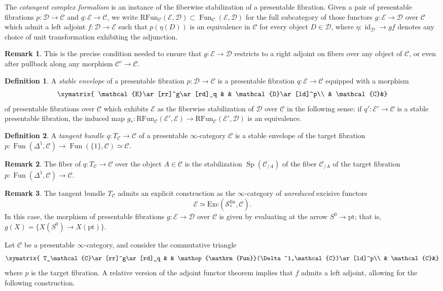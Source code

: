\documentclass[12pt]{article}
\theoremstyle{definition}
\newtheorem{definition}{Definition}[subsection]
\newtheorem{remark}{Remark}[subsection]
\newcommand{\C}{\mathcal{C}}
\newcommand{\D}{\mathcal{D}}
\newcommand{\E}{\mathcal{E}}
\renewcommand{\S}{\mathcal{S}}
\renewcommand{\i}{\infty}
\DeclareMathOperator{\Fun}{Fun}
\newcommand{\Funr}{\mathrm{RFun}}
\DeclareMathOperator{\id}{id}
\DeclareMathOperator{\Sp}{Sp}
\newcommand{\pt}{\mathrm{pt}}
\begin{document}
The {\em cotangent complex formalism} is an instance of the fiberwise stabilization of a presentable  fibration.
Given a pair of presentable fibrations $p:\D\to\C$ and $q:\E\to\C$, we write $\Funr_\C(\E,\D)\subset\Fun_\C(\E,\D)$ for the full subcategory of those functors $g:\E\to\D$ over $\C$ which admit a left adjoint $f:\D\to\E$ such that $p(\eta(D))$ is an equivalence in $\C$ for every object $D\in\D$, where $\eta:\id_\D\to gf$ denotes any choice of unit transformation exhibiting the adjunction.
\begin{remark}
This is the precise condition needed to ensure that $g:\E\to\D$ restricts to a right adjoint on fibers over any object of $\C$, or even after pullback along any morphism $\C'\to\C$. 
\end{remark}
\begin{definition}
A {\em stable envelope} of a presentable fibration $p:\D\to\C$ is a presentable fibration $q:\E\to\C$ equipped with a morphism 
\[
\xymatrix{
\E\ar[rr]^g\ar[rd]_q & & \D\ar[ld]^p\\
& \C &}
\]
of presentable fibrations over $\C$ which exhibits $\E$ as the fiberwise stabilization of $\D$ over $\C$ in the following sense: if $q':\E'\to\C$ is a stable presentable fibration, the induced map $g_*:\Funr_\C(\E',\E)\to\Funr_\C(\E',\D)$ is an equivalence.
\end{definition}


\begin{definition}
A {\em tangent bundle} $q:T_\C\to\C$ of a presentable $\infty$-category $\C$ is a stable envelope of the target fibration $p:\Fun(\Delta^1,\C)\to\Fun(\{1\},\C)\simeq\C$.
\end{definition}

\begin{remark}The fiber of $q:T_\C\to\C$ over the object $A\in\C$ is the stabilization $\Sp(\C_{/A})$ of the fiber $\C_{/A}$ of the target fibration $p:\Fun(\Delta^1,\C)\to\C$.
\end{remark}
\begin{remark}
The tangent bundle $T_\C$ admits an explicit construction as the $\i$-category of {\em unreduced} excisive functors
\[
\E\simeq\mathrm{Exc}(\S_*^\mathrm{fin},\C).
\]
In this case, the morphism of presentable fibrations $g:\E\to\D$ over $\C$ is given by evaluating  at the arrow $S^0\to\pt$; that is, $g(X)=\{X(S^0)\to X(\pt)\}$.
\end{remark}


Let $\C$ be a presentable $\i$-category, and consider the commutative triangle
\[
\xymatrix{
T_\C\ar[rr]^g\ar[rd]_q & & \Fun(\Delta^1,\C)\ar[ld]^p\\
& \C &}
\]
where $p$ is the target fibration.
A relative version of the adjoint functor theorem implies that $f$ admits a left adjoint,
allowing for the following construction.
\end{document}
